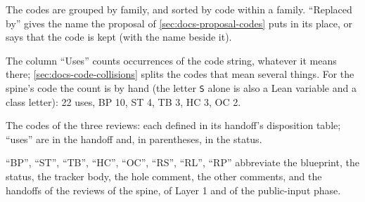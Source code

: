 
The codes are grouped by family, and sorted by code within a family. ``Replaced by'' gives the name the proposal of \cref{sec:docs-proposal-codes} puts in its place, or says that the code is kept (with the name beside it).

The column ``Uses'' counts occurrences of the code string, whatever it means there; \cref{sec:docs-code-collisions} splits the codes that mean several things. For the spine's code the count is by hand (the letter \texttt{S} alone is also a Lean variable and a class letter): 22 uses, BP 10, ST 4, TB 3, HC 3, OC 2.

The codes of the three reviews: each defined in its handoff's disposition table; ``uses'' are in the handoff and, in parentheses, in the status.

``BP'', ``ST'', ``TB'', ``HC'', ``OC'', ``RS'', ``RL'', ``RP'' abbreviate the blueprint, the status, the tracker body, the hole comment, the other comments, and the handoffs of the reviews of the spine, of Layer 1 and of the public-input phase.

